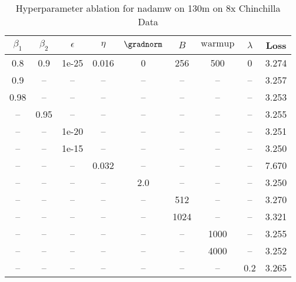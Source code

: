 \begin{table}[h!]
\centering
\caption{Hyperparameter ablation for nadamw on 130m on 8x Chinchilla Data}
\label{tab:ablation_nadamw_130m_on_8x_chinchilla_data}
\begin{tabular}{ccccccccc}
\toprule
$\beta_1$ & $\beta_2$ & $\epsilon$ & $\eta$ & $\gradnorm$ & $B$ & $\mathrm{warmup}$ & $\lambda$ & Loss \\
\midrule
0.8 & 0.9 & 1e-25 & 0.016 & 0 & 256 & 500 & 0 & 3.274 \\
\midrule
0.9 & -- & -- & -- & -- & -- & -- & -- & 3.257 \\
0.98 & -- & -- & -- & -- & -- & -- & -- & 3.253 \\
-- & 0.95 & -- & -- & -- & -- & -- & -- & 3.255 \\
-- & -- & 1e-20 & -- & -- & -- & -- & -- & 3.251 \\
-- & -- & 1e-15 & -- & -- & -- & -- & -- & 3.250 \\
-- & -- & -- & 0.032 & -- & -- & -- & -- & 7.670 \\
-- & -- & -- & -- & 2.0 & -- & -- & -- & 3.250 \\
-- & -- & -- & -- & -- & 512 & -- & -- & 3.270 \\
-- & -- & -- & -- & -- & 1024 & -- & -- & 3.321 \\
-- & -- & -- & -- & -- & -- & 1000 & -- & 3.255 \\
-- & -- & -- & -- & -- & -- & 4000 & -- & 3.252 \\
-- & -- & -- & -- & -- & -- & -- & 0.2 & 3.265 \\
\bottomrule
\end{tabular}
\end{table}

